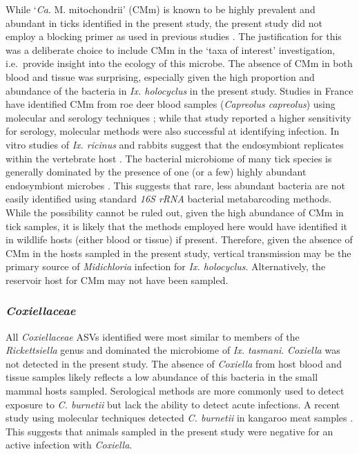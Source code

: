 \documentclass[a4paper, nobind]{templates/ociamthesis}
\begin{document}
While `\emph{Ca}. M. mitochondrii' (CMm) is known to be highly prevalent and abundant in ticks identified in the present study, the present study did not employ a blocking primer as used in previous studies \autocite{goftonInhibitionEndosymbiontCandidatus2015,eganBacterialCommunityProfiling2020}.
The justification for this was a deliberate choice to include CMm in the `taxa of interest' investigation, i.e.~provide insight into the ecology of this microbe.
The absence of CMm in both blood and tissue was surprising, especially given the high proportion and abundance of the bacteria in \emph{Ix. holocyclus} in the present study.
Studies in France have identified CMm from roe deer blood samples (\emph{Capreolus capreolus}) using molecular and serology techniques \autocite{serraMolecularSerologicalEvidence2018}; while that study reported a higher sensitivity for serology, molecular methods were also successful at identifying infection.
In vitro studies of \emph{Ix. ricinus} and rabbits suggest that the endosymbiont replicates within the vertebrate host \autocite{cafisoMidichloriaMitochondriiEndosymbiont2019}.
The bacterial microbiome of many tick species is generally dominated by the presence of one (or a few) highly abundant endosymbiont microbes \autocite{claytonCharacterizationManipulationBacterial2015,goftonInhibitionEndosymbiontCandidatus2015,varela-stokesMicrobialCommunitiesNorth2017}.
This suggests that rare, less abundant bacteria are not easily identified using standard \emph{16S rRNA} bacterial metabarcoding methods.
While the possibility cannot be ruled out, given the high abundance of CMm in tick samples, it is likely that the methods employed here would have identified it in wildlife hosts (either blood or tissue) if present.
Therefore, given the absence of CMm in the hosts sampled in the present study, vertical transmission may be the primary source of \emph{Midichloria} infection for \emph{Ix. holocyclus}. Alternatively, the reservoir host for CMm may not have been sampled.

\hypertarget{coxiellaceae-1}{%
\subsubsection{\texorpdfstring{\emph{Coxiellaceae}}{Coxiellaceae}}\label{coxiellaceae-1}}

All \emph{Coxiellaceae} ASVs identified were most similar to members of the \emph{Rickettsiella} genus and dominated the microbiome of \emph{Ix. tasmani}.
\emph{Coxiella} was not detected in the present study.
The absence of \emph{Coxiella} from host blood and tissue samples likely reflects a low abundance of this bacteria in the small mammal hosts sampled.
Serological methods are more commonly used to detect exposure to \emph{C. burnetii} \autocite{cooperSerologicalEvidenceCoxiella2012} but lack the ability to detect acute infections.
A recent study using molecular techniques detected \emph{C. burnetii} in kangaroo meat samples \autocite{shapiroMolecularDetectionCoxiella2020}. This suggests that animals sampled in the present study were negative for an active infection with \emph{Coxiella}.
\end{document}
